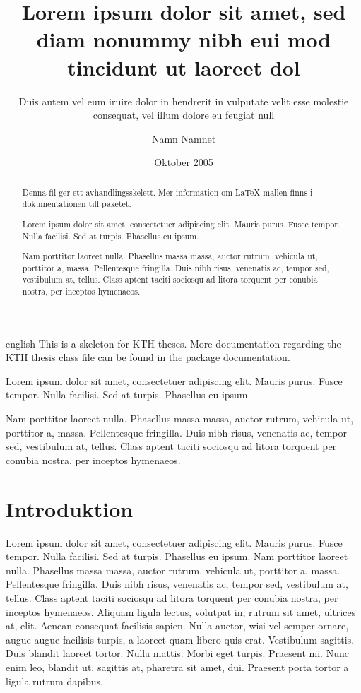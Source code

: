 \documentclass[a4paper,11pt]{kth-mag}
\title{Lorem ipsum dolor sit amet, sed diam nonummy nibh eui
       mod tincidunt ut laoreet dol}
\subtitle{Duis autem vel eum iruire dolor in hendrerit in
          vulputate velit esse molestie consequat, vel illum
          dolore eu feugiat null}
\author{Namn Namnet}
\date{Oktober 2005}
\begin{document}
\frontmatter
\pagestyle{empty}
\removepagenumbers
\maketitle
{}
\begin{abstract}
  Denna fil ger ett avhandlingsskelett.
  Mer information om \LaTeX-mallen finns i
  dokumentationen till paketet.

Lorem ipsum dolor sit amet, consectetuer adipiscing elit. Mauris
purus. Fusce tempor. Nulla facilisi. Sed at turpis. Phasellus eu
ipsum.

Nam porttitor laoreet nulla. Phasellus massa massa, auctor
rutrum, vehicula ut, porttitor a, massa. Pellentesque fringilla. Duis
nibh risus, venenatis ac, tempor sed, vestibulum at, tellus. Class
aptent taciti sociosqu ad litora torquent per conubia nostra, per
inceptos hymenaeos.
\end{abstract}
\clearpage
\begin{foreignabstract}{english}
  This is a skeleton for KTH theses. More documentation
  regarding the KTH thesis class file can be found in
  the package documentation.

Lorem ipsum dolor sit amet, consectetuer adipiscing elit. Mauris
purus. Fusce tempor. Nulla facilisi. Sed at turpis. Phasellus eu
ipsum.

Nam porttitor laoreet nulla. Phasellus massa massa, auctor
rutrum, vehicula ut, porttitor a, massa. Pellentesque fringilla. Duis
nibh risus, venenatis ac, tempor sed, vestibulum at, tellus. Class
aptent taciti sociosqu ad litora torquent per conubia nostra, per
inceptos hymenaeos. 
\end{foreignabstract}
\clearpage
\tableofcontents*
\mainmatter
\pagestyle{newchap}
\chapter{Introduktion}

Lorem ipsum dolor sit amet, consectetuer adipiscing elit. Mauris
purus. Fusce tempor. Nulla facilisi. Sed at turpis. Phasellus eu
ipsum. Nam porttitor laoreet nulla. Phasellus massa massa, auctor
rutrum, vehicula ut, porttitor a, massa. Pellentesque fringilla. Duis
nibh risus, venenatis ac, tempor sed, vestibulum at, tellus. Class
aptent taciti sociosqu ad litora torquent per conubia nostra, per
inceptos hymenaeos. Aliquam ligula lectus, volutpat in, rutrum sit
amet, ultrices at, elit. Aenean consequat facilisis sapien. Nulla
auctor, wisi vel semper ornare, augue augue facilisis turpis, a
laoreet quam libero quis erat. Vestibulum sagittis. Duis blandit
laoreet tortor. Nulla mattis. Morbi eget turpis. Praesent mi. Nunc
enim leo, blandit ut, sagittis at, pharetra sit amet, dui. Praesent
porta tortor a ligula rutrum dapibus.
\end{document}
